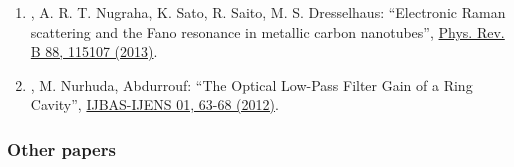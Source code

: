 \begin{enumerate}
    ``Breit-Wigner-Fano lineshapes in Raman spectra of graphene'',
    \href{http://dx.doi.org/10.1103/PhysRevB.90.245140} {Phys. Rev. B
      90, 245140 (2014)}.
    \item \hes,  A. R. T. Nugraha, K. Sato, R. Saito,
  M. S. Dresselhaus: ``Electronic Raman scattering and the Fano
  resonance in metallic carbon nanotubes'',
  \href{http://dx.doi.org/10.1103/PhysRevB.88.115107}{
      Phys. Rev. B 88, 115107 (2013)}.
\item \hes, M. Nurhuda, Abdurrouf: ``The Optical Low-Pass Filter Gain
  of a Ring Cavity'',
  \href{http://www.ijens.org/Vol_12_I_01/125701-9494-IJBAS-IJENS.pdf}
  {IJBAS-IJENS  01, 63-68 (2012)}.
\end{enumerate}

\subsubsection*{Other papers}
